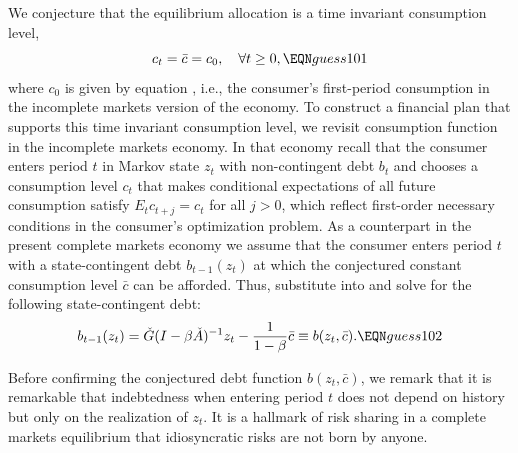 We conjecture that the equilibrium allocation is a time
invariant consumption level, 
$$ c_t = \bar c  = c_0 , \quad \forall t \geq 0, \EQN guess101 $$
where  $c_0$ is given by equation , i.e.,
the consumer's first-period consumption in the 
incomplete markets version of the economy.
To construct a financial plan that supports this
time invariant consumption level, we revisit consumption
function  in the 
incomplete markets economy. In that economy recall that
the consumer enters period $t$ in Markov state $z_t$
with non-contingent debt $b_t$ and chooses a 
consumption level $c_t$ that makes conditional 
expectations of all future consumption satisfy 
$E_t c_{t+j} = c_t$ for all $j>0$, which reflect
first-order necessary conditions in the consumer's
optimization problem. As a counterpart 
in the present complete markets 
economy we assume  that the consumer enters period $t$
with a state-contingent debt $b_{t-1}(z_t)$ at which the  conjectured constant 
consumption level $\bar c$ can be afforded. Thus, 
substitute  into 
 and
solve for the following state-contingent debt:
$$ b_{t-1}(z_{t}) =  \check G(I-\beta \check A)^{-1} z_{t} 
- {\frac{1}{1-\beta}} \bar c \equiv b(z_{t}, \bar c) . 
                                           \EQN guess102 $$
                                           
Before confirming the conjectured debt function $b(z_{t}, \bar c)$, 
we remark that it is 
remarkable that indebtedness when entering
period $t$ does not depend on history but only on 
the realization of $z_{t}$.
It is a hallmark of risk sharing in 
a complete markets equilibrium that idiosyncratic risks
are not born by anyone.

